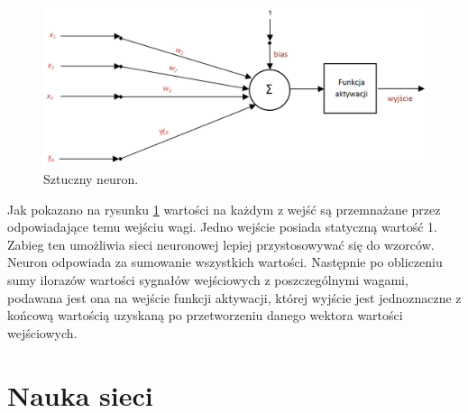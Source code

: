 \begin{figure}[!htbp]
\centering
\includegraphics[width=1\linewidth]{./include/perceptron}
\caption{Sztuczny neuron.}
\label{fig:perceptron}
\end{figure}

Jak pokazano na rysunku \ref{fig:perceptron} wartości na każdym z wejść są przemnażane przez odpowiadające temu wejściu wagi. Jedno wejście posiada statyczną wartość 1. Zabieg ten umożliwia sieci neuronowej lepiej przystosowywać się do wzorców. Neuron odpowiada za sumowanie wszystkich wartości. Następnie po obliczeniu sumy ilorazów wartości sygnałów wejściowych z poszczególnymi wagami, podawana jest ona na wejście funkcji aktywacji, której wyjście jest jednoznaczne z końcową wartością uzyskaną po przetworzeniu danego wektora wartości wejściowych. 

\section{Nauka sieci}

